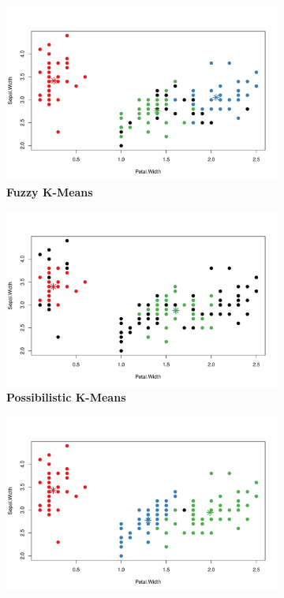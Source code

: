 \documentclass[12pt]{article}
\begin{document}
\begin{figure}[h]
	\centering
	\begin{subfigure}[h]{0.49\textwidth}
		\centering
		\includegraphics[width=\textwidth]{iris_fkm}
		\caption{\textbf{Fuzzy K-Means}}
		\label{fig:iris_fkm}
	\end{subfigure}
	\begin{subfigure}[h]{0.49\textwidth}
		\centering
		\includegraphics[width=\textwidth]{iris_pcm}
		\caption{\textbf{Possibilistic K-Means}}
		\label{fig:iris_pcm}
	\end{subfigure}
	\begin{subfigure}[h]{0.49\textwidth}
		\centering
		\includegraphics[width=\textwidth]{iris_mclust}

\end{subfigure}
\end{figure}
\end{document}

